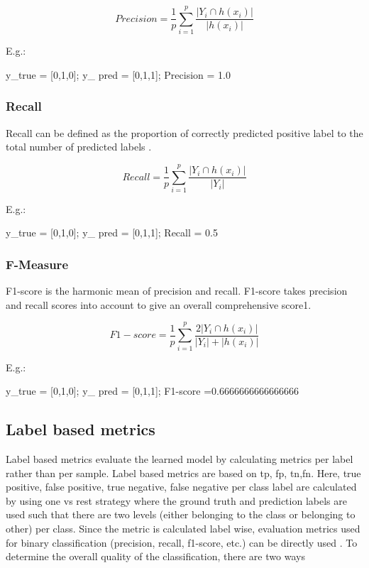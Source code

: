 $$Precision = \frac{1}{p}\sum_{i =1}^{p}\frac{|Y_i \cap h(x_i)|}{|h(x_i)|}$$ \cite{zhang2010multi}

E.g.: 

y\_true = [0,1,0]; 
y\_ pred = [0,1,1];  
Precision = 1.0

\subsubsection{Recall}

Recall can be defined as the proportion of correctly predicted positive label to the total number of predicted labels \cite{sorower2010literature}.

$$Recall = \frac{1}{p}\sum_{i =1}^{p}\frac{|Y_i \cap h(x_i)|}{|Y_i|}$$ \cite{zhang2010multi}

E.g.: 

y\_true = [0,1,0]; 
y\_ pred = [0,1,1];  
Recall = 0.5

\subsubsection{F-Measure}
F1-score is the harmonic mean of precision and recall. F1-score takes precision and recall scores into account to give an overall comprehensive score1\cite{sorower2010literature}.

$$F1-score = \frac{1}{p}\sum_{i =1}^{p}\frac{2|Y_i \cap h(x_i)|}{|Y_i| + |h(x_i)|}$$ \cite{zhang2010multi}

E.g.: 

y\_true = [0,1,0]; 
y\_ pred = [0,1,1]; 
F1-score =0.6666666666666666

\subsection{Label based metrics}
Label based metrics evaluate the learned model by  calculating metrics per label rather than per sample\cite{zhang2013review}. Label based metrics are based on \acrfull{tp}, \acrfull{fp}, \acrfull{tn},\acrfull{fn}. Here, true positive, false positive, true negative, false negative per class label are calculated by using one vs rest strategy where the ground truth and prediction labels are used such that there are two levels (either belonging to the class or belonging to other) per class. Since the metric is calculated label wise, evaluation metrics used for binary classification (precision, recall, f1-score, etc.)  can be directly used \cite{sorower2010literature}.  To determine the overall quality of the classification, there are two ways 
    
